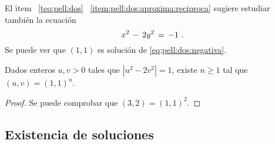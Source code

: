 El \'{\i}tem \teoname~\ref{teo:pell:dos}~%
\eqref{item:pell:dos:aproxima:reciproca}
sugiere estudiar tambi\'en la ecuaci\'on
\begin{equation}
	\label{eq:pell:dos:negativa}
	x^2\,-\,2y^2\,=\,-1
	\text{ .}
\end{equation}
%
Se puede ver que $(1,1)$ es soluci\'on de \eqref{eq:pell:dos:negativa}.

\begin{teoPell}\label{teo:pell:dos:negativa}
	Dados enteros $u,v>0$ tales que $|u^2-2v^2|=1$, existe $n\geq 1$
	tal que $(u,v)=(1,1)^n$.
\end{teoPell}

\begin{proof}
	Se puede comprobar que $(3,2)=(1,1)^2$.
\end{proof}

\subsection{Existencia de soluciones}\label{subsec:pell:existencia}
